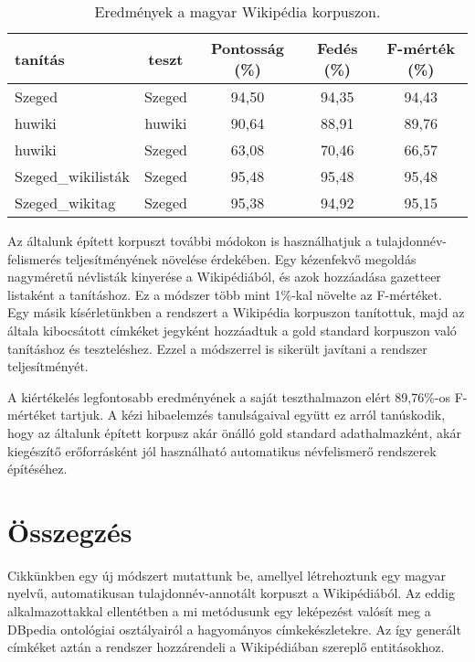 \documentclass{llncs}
\begin{document}
\begin{table}[ht]
\begin{center}
\begin{tabular}{lcccc}
\toprule 
\bf tanítás & \bf teszt & \bf Pontosság (\%) & \bf Fedés (\%) & \bf F-mérték (\%) \\ 
\midrule
Szeged & Szeged & 94,50 & 94,35 & 94,43 \\
huwiki & huwiki & 90,64 & 88,91 &  89,76  \\
huwiki & Szeged & 63,08 & 70,46 & 66,57  \\
Szeged\_wikilisták & Szeged & 95,48 & 95,48 & 95,48  \\
Szeged\_wikitag & Szeged & 95,38 & 94,92 & 95,15 \\
\bottomrule
\end{tabular}
\end{center}
\caption{Eredmények a magyar Wikipédia korpuszon.}
\label{tab:huresults}
\end{table}

Az általunk épített korpuszt további módokon is használhatjuk a tulajdonnév-felismerés teljesítményének növelése érdekében. Egy kézenfekvő megoldás nagyméretű névlisták kinyerése a Wikipédiából, és azok hozzáadása gazetteer listaként a tanításhoz. Ez a módszer több mint 1\%-kal növelte az F-mértéket. Egy másik kísérletünkben a rendszert a Wikipédia korpuszon tanítottuk, majd az általa kibocsátott címkéket jegyként hozzáadtuk a gold standard korpuszon való tanításhoz és teszteléshez. Ezzel a módszerrel is sikerült javítani a rendszer teljesítményét. 

A kiértékelés legfontosabb eredményének a saját teszthalmazon elért 89,76\%-os F-mértéket tartjuk. A kézi hibaelemzés tanulságaival együtt ez arról tanúskodik, hogy az általunk épített korpusz akár önálló gold standard adathalmazként, akár kiegészítő erőforrásként jól használható automatikus névfelismerő rendszerek építéséhez. 

\section{Összegzés}
\label{conc}

Cikkünkben egy új módszert mutattunk be, amellyel létrehoztunk egy magyar nyelvű, automatikusan tulajdonnév-annotált korpuszt a Wikipédiából. Az eddig alkalmazottakkal ellentétben a mi metódusunk egy leképezést valósít meg a DBpedia ontológiai osztályairól a hagyományos címkekészletekre. Az így generált címkéket aztán a rendszer hozzárendeli a Wikipédiában szereplő entitásokhoz. 
\end{document}
